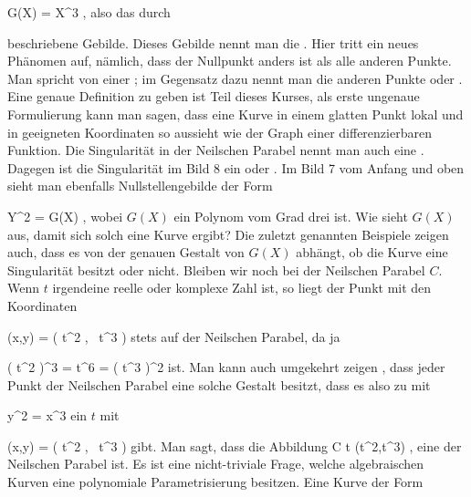 \mavergleichskette
{\vergleichskette
{G(X)
}
{ = }{ X^3
}
{  }{
}
{    }{
}
{   }{
}
}
{}{}{,}
also das durch

 {  }

beschriebene Gebilde. Dieses Gebilde nennt man die  {.} Hier tritt ein neues Phänomen auf, nämlich, dass der Nullpunkt anders ist als alle anderen Punkte. Man spricht von einer  {;} im Gegensatz dazu nennt man die anderen Punkte  {} oder  {.} Eine genaue Definition zu geben ist Teil dieses Kurses, als erste ungenaue Formulierung kann man sagen, dass eine Kurve in einem glatten Punkt lokal und in geeigneten Koordinaten so aussieht wie der
 {} {}
Graph einer differenzierbaren Funktion. Die Singularität in der Neilschen Parabel nennt man auch eine  {}
 {} {.}
Dagegen ist die Singularität im Bild 8 ein  {} oder  {.}
Im Bild 7 vom Anfang und oben sieht man ebenfalls Nullstellengebilde der Form

\mavergleichskette
{\vergleichskette
{Y^2
}
{ = }{ G(X)
}
{  }{
}
{    }{
}
{   }{
}
}
{}{}{,}
wobei $G(X)$ ein Polynom vom Grad drei ist. Wie sieht $G(X)$ aus, damit sich solch eine Kurve ergibt? Die zuletzt genannten Beispiele zeigen auch, dass es von der genauen Gestalt von $G(X)$ abhängt, ob die Kurve eine Singularität besitzt oder nicht.
Bleiben wir noch bei der Neilschen Parabel $C$. Wenn $t$ irgendeine reelle oder komplexe Zahl ist, so liegt der Punkt mit den Koordinaten

\mavergleichskette
{\vergleichskette
{ (x,y)
}
{ = }{ \left( t^2  , \,  t^3                   \right)
}
{  }{
}
{    }{
}
{   }{
}
}
{}{}{}
stets auf der Neilschen Parabel, da ja

\mavergleichskette
{\vergleichskette
{ \left(  t^2  \right)^3
}
{ = }{ t^6
}
{ = }{ \left(  t^3  \right)^2
}
{    }{
}
{   }{
}
}
{}{}{}
ist. Man kann auch umgekehrt zeigen
 {} {,}
dass jeder Punkt der Neilschen Parabel eine solche Gestalt besitzt, dass es also zu
 mit

\mavergleichskette
{\vergleichskette
{ y^2
}
{ = }{ x^3
}
{  }{
}
{    }{
}
{   }{
}
}
{}{}{}
ein
 {} {}
$t$ mit

\mavergleichskette
{\vergleichskette
{ (x,y)
}
{ = }{ \left( t^2  , \,  t^3                   \right)
}
{  }{
}
{    }{
}
{   }{
}
}
{}{}{}
gibt. Man sagt, dass die Abbildung
\maabbeledisp {} {\R} {C
} {t} {(t^2,t^3)
} {,}
eine
 {} {}
 {} der Neilschen Parabel ist. Es ist eine nicht-triviale Frage, welche algebraischen Kurven eine polynomiale Parametrisierung besitzen. Eine Kurve der Form

